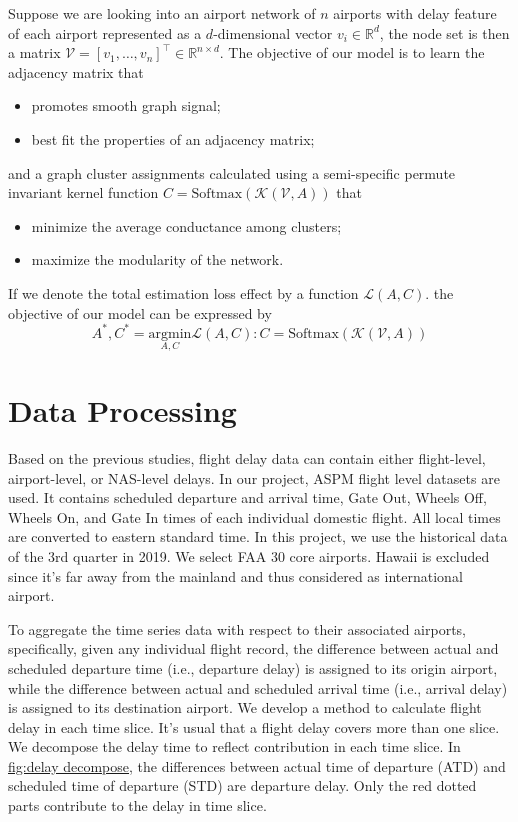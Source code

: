 Suppose we are looking into an airport network of $n$ airports with delay feature of each airport represented as a $d$-dimensional vector $v_i\in\mathbb{R}^d$, the node set is then a matrix $\mathcal{V}=[v_1,\ldots,v_n]^\intercal\in\mathbb{R}^{n\times d}$. The objective of our model is to learn the adjacency matrix that
\begin{itemize}
    \item promotes smooth graph signal;
    \item best fit the properties of an adjacency matrix;
\end{itemize}
and a graph cluster assignments calculated using a semi-specific permute invariant kernel function $C=\text{Softmax}(\mathcal{K}(\mathcal{V}, A))$ that
\begin{itemize}
    \item minimize the average conductance among clusters;
    \item maximize the modularity of the network.
\end{itemize}

If we denote the total estimation loss effect by a function $\mathcal{L}(A,C)$. the objective of our model can be expressed by
\begin{equation}
    A^*, C^* = \underset{A, C}{\text{argmin}}\mathcal{L}(A, C): C=\text{Softmax}(\mathcal{K}(\mathcal{V}, A))
\end{equation}

\section{Data Processing}
Based on the previous studies, flight delay data can contain either flight-level, airport-level, or NAS-level delays\cite{dai2021having}. In our project, ASPM flight level datasets are used. It contains scheduled departure and arrival time, Gate Out, Wheels Off, Wheels On, and Gate In times of each individual domestic flight.  All local times are converted to eastern standard time. In this project, we use the historical data of the 3rd quarter in 2019. We select FAA 30 core airports. Hawaii is excluded since it’s far away from the mainland and thus considered as international airport. 

To aggregate the time series data with respect to their associated airports, specifically, given any individual flight record, the difference between actual and scheduled departure time (i.e., departure delay) is assigned to its origin airport, while the difference between actual and scheduled arrival time (i.e., arrival delay) is assigned to its destination airport. We develop a method to calculate flight delay in each time slice. It’s usual that a flight delay covers more than one slice. We decompose the delay time to reflect contribution in each time slice. In \hyperref[fig:delay decompose]{fig:delay decompose}, the differences between actual time of departure (ATD) and scheduled time of departure (STD) are departure delay. Only the red dotted parts contribute to the delay in time slice. 

